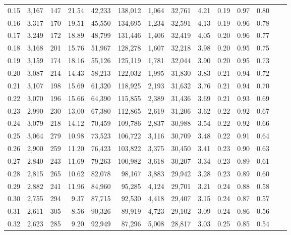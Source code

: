 \begin{tabular}{rrrrrrrrrrrrrr}
0.15 &  3,167 &  147 &   21.54 &   42,233 &  138,012 &   1,064 &  32,761 &  4.21 &  0.19 &  0.97 &      0.80 \\
0.16 &  3,317 &  170 &   19.51 &   45,550 &  134,695 &   1,234 &  32,591 &  4.13 &  0.19 &  0.96 &      0.78 \\
0.17 &  3,249 &  172 &   18.89 &   48,799 &  131,446 &   1,406 &  32,419 &  4.05 &  0.20 &  0.96 &      0.77 \\
0.18 &  3,168 &  201 &   15.76 &   51,967 &  128,278 &   1,607 &  32,218 &  3.98 &  0.20 &  0.95 &      0.75 \\
0.19 &  3,159 &  174 &   18.16 &   55,126 &  125,119 &   1,781 &  32,044 &  3.90 &  0.20 &  0.95 &      0.73 \\
0.20 &  3,087 &  214 &   14.43 &   58,213 &  122,032 &   1,995 &  31,830 &  3.83 &  0.21 &  0.94 &      0.72 \\
0.21 &  3,107 &  198 &   15.69 &   61,320 &  118,925 &   2,193 &  31,632 &  3.76 &  0.21 &  0.94 &      0.70 \\
0.22 &  3,070 &  196 &   15.66 &   64,390 &  115,855 &   2,389 &  31,436 &  3.69 &  0.21 &  0.93 &      0.69 \\
0.23 &  2,990 &  230 &   13.00 &   67,380 &  112,865 &   2,619 &  31,206 &  3.62 &  0.22 &  0.92 &      0.67 \\
0.24 &  3,079 &  218 &   14.12 &   70,459 &  109,786 &   2,837 &  30,988 &  3.54 &  0.22 &  0.92 &      0.66 \\
0.25 &  3,064 &  279 &   10.98 &   73,523 &  106,722 &   3,116 &  30,709 &  3.48 &  0.22 &  0.91 &      0.64 \\
0.26 &  2,900 &  259 &   11.20 &   76,423 &  103,822 &   3,375 &  30,450 &  3.41 &  0.23 &  0.90 &      0.63 \\
0.27 &  2,840 &  243 &   11.69 &   79,263 &  100,982 &   3,618 &  30,207 &  3.34 &  0.23 &  0.89 &      0.61 \\
0.28 &  2,815 &  265 &   10.62 &   82,078 &   98,167 &   3,883 &  29,942 &  3.28 &  0.23 &  0.89 &      0.60 \\
0.29 &  2,882 &  241 &   11.96 &   84,960 &   95,285 &   4,124 &  29,701 &  3.21 &  0.24 &  0.88 &      0.58 \\
0.30 &  2,755 &  294 &    9.37 &   87,715 &   92,530 &   4,418 &  29,407 &  3.15 &  0.24 &  0.87 &      0.57 \\
0.31 &  2,611 &  305 &    8.56 &   90,326 &   89,919 &   4,723 &  29,102 &  3.09 &  0.24 &  0.86 &      0.56 \\
0.32 &  2,623 &  285 &    9.20 &   92,949 &   87,296 &   5,008 &  28,817 &  3.03 &  0.25 &  0.85 &      0.54 \\

\end{tabular}
